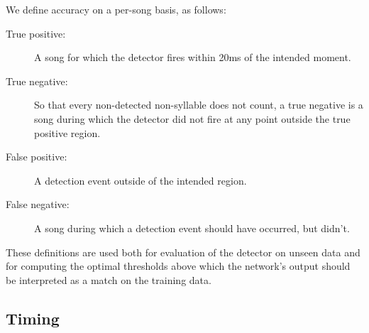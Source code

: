 \documentclass{article}
\newcommand\argmin{\mathop{\mbox{{\rm argmin}}}\limits}
\newcommand{\noprint}[1]{}
\begin{document}
We define accuracy on a per-song basis, as follows:

\begin{description}
  \item[True positive:] A song for which the detector fires within
    20ms of the intended moment.
  \item[True negative:] So that every non-detected non-syllable does
    not count, a true negative is a song during which the detector
    did not fire at any point outside the true positive region.
  \item[False positive:] A detection event outside of the intended region.
  \item[False negative:] A song during which a detection event should
    have occurred, but didn't.
\end{description}

These definitions are used both for evaluation of the detector on
unseen data and for computing the optimal thresholds above which the
network's output should be interpreted as a match on the training data.

\noprint{
Since the network
will output values $o_t$ between 0 and 1 at each moment $t$ in an
attempt to match the training output, the optimal threshold
$\tau\in[0,1]$ for the output neuron should be computed.  Given the
relative cost of false positives vs.~false negatives $C$, and the
accptable time difference between target syllable and correct output
$\Delta t_d$, we compute the optimal threshold for an output element
according to the definitions above:
\begin{eqnarray*}
  \mbox{true positives}_\tau &=& \mbox{size of set}_{s\in \mbox{target songs}} o_t > \tau, \left| t \leq \Delta t_d \right| \\
  \mbox{false negatives}_\tau &=& \mbox{size of set} {s\in\mbox{target songs}} - \mbox{size of set} \mbox{true positives} \\
  \mbox{false positives}_\tau &=& \mbox{size of set}_{s\in \mbox{target songs}} o_t > \tau, \left| t > \Delta t_d \right| \\
  \widehat{\tau} &=& \argmin_\tau C\mbox{false positive} + \mbox{false negatives}
\end{eqnarray*}
}

\subsection{Timing}
\end{document}

